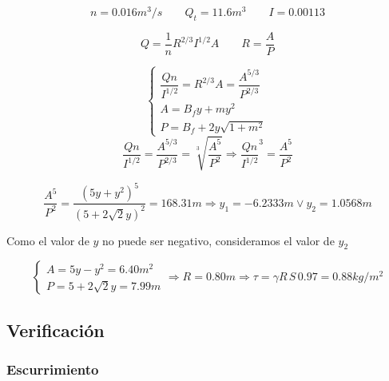\documentclass[10.5pt]{article}
\begin{document}
\begin{equation*}
  n = 0.016 m^3/s
 \qquad
  Q_{t} = 11.6 m^{3}
 \qquad
  I = 0.00113
\end{equation*}

\begin{equation*}
 Q = \frac{1}{n} R^{2/3} I^{1/2} A
 \qquad
 R = \frac{A}{P}
\end{equation*}

\begin{equation*}
  \begin{cases}
    \dfrac{Q n}{I^{1/2}} = R^{2/3} A = \dfrac{A^{5/3}}{P^{2/3}} \\
    A = B_{f}y + m y^{2} \\
    P = B_{f} + 2 y \sqrt{1 + m^{2}}
  \end{cases}
\end{equation*}
\begin{equation*}
  \dfrac{Q n}{I^{1/2}} = \dfrac{A^{5/3}}{P^{2/3}} = \sqrt[3]{\dfrac{A^{5}}{P^{2}}}
  \Rightarrow
  \dfrac{Q n}{I^{1/2}}^{3} = \dfrac{A^{5}}{P^{2}}
\end{equation*}

\begin{equation*}
  \dfrac{A^{5}}{P^{2}} = \dfrac{(5 y + y^{2})^{5}}{(5 + 2 \sqrt{2} y)^{2}} = 168.31 m
  \Rightarrow
  y_{1} = -6.2333 m \vee y_{2} = 1.0568 m
\end{equation*}


Como el valor de $y$ no puede ser negativo, consideramos el valor de $y_{2}$

\begin{equation*}
  \begin{cases}
    A = 5 y - y^{2} = 6.40 m^{2} \\
    P = 5 + 2 \sqrt{2} y = 7.99 m
  \end{cases}
  \Rightarrow
  R = 0.80 m
  \Rightarrow
  \tau = \gamma R \, S \, 0.97 = 0.88 kg/m^{2}
\end{equation*}


\subsection*{Verificación}

\subsubsection*{Escurrimiento}
\end{document}
